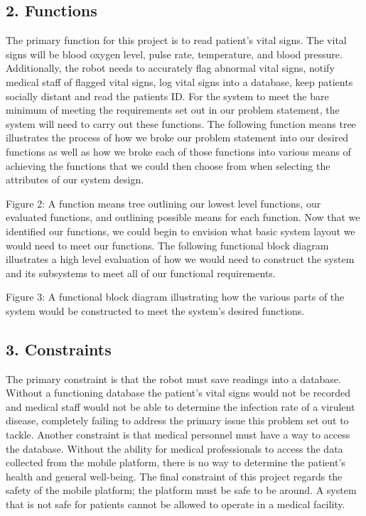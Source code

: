 ﻿\documentclass[10pt]{article}
\begin{document}
\subsection{2. Functions}
        The primary function for this project is to read patient’s vital signs. The vital signs will be blood oxygen level, pulse rate, temperature, and blood pressure. Additionally, the robot needs to accurately flag abnormal vital signs, notify medical staff of flagged vital signs, log vital signs into a database, keep patients socially distant and read the patients ID. For the system to meet the bare minimum of meeting the requirements set out in our problem statement, the system will need to carry out these functions. The following function means tree illustrates the process of how we broke our problem statement into our desired functions as well as how we broke each of those functions into various means of achieving the functions that we could then choose from when selecting the attributes of our system design.
  

Figure 2: A function means tree outlining our lowest level functions, our evaluated functions, and outlining possible means for each function. 
Now that we identified our functions, we could begin to envision what basic system layout we would need to meet our functions. The following functional block diagram illustrates a high level evaluation of how we would need to construct the system and its subsystems to meet all of our functional requirements. 
  

Figure 3: A functional block diagram illustrating how the various parts of the system would be constructed to meet the system’s desired functions.

\subsection{3. Constraints}
The primary constraint is that the robot must save readings into a database. Without a functioning database the patient’s vital signs would not be recorded and medical staff would not be able to determine the infection rate of a virulent disease, completely failing to address the primary issue this problem set out to tackle. Another constraint is that medical personnel must have a way to access the database. Without the ability for medical professionals to access the data collected from the mobile platform, there is no way to determine the patient’s health and general well-being. The final constraint of this project regards the safety of  the mobile platform; the platform must be safe to be around. A system that is not safe for patients cannot be allowed to operate in a medical facility.
\end{document}
